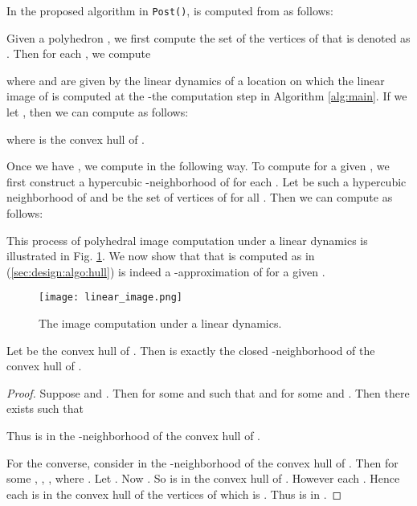 In the proposed algorithm in {\tt Post()},  is computed from  as follows:

Given a polyhedron , we first compute the set of the vertices of  that is denoted as .
Then for each , we compute 
 
where  and  are given by the linear dynamics of a location  on which the linear image of  is computed at the -the computation step in Algorithm \ref{alg:main}. 
If we let , then we can compute  as follows: 

where  is the convex hull of . 

Once we have , we compute  in the following way.
To compute  for a given , we first construct a hypercubic -neighborhood of  for each .
Let  be such a  hypercubic neighborhood of  and  be the set of vertices of  for all .
Then we can compute  as follows:


This process of polyhedral image computation under a linear dynamics is illustrated in Fig. \ref{fig:post:linear}.
We now show that  that is computed as in (\ref{sec:design:algo:hull}) is indeed a -approximation of  for a given .




\begin{figure} [htbp]
\begin{center}
	\texttt{[image: linear\_image.png]}
\caption{The image computation under a linear dynamics.}
\label{fig:post:linear}
\end{center}
\end{figure}




\begin{lem}
Let  be the convex hull of . 
Then  is exactly the closed -neighborhood of the convex hull of .
\end{lem}
\begin{proof}
Suppose  and .
Then  for some  and  such that  and  for some  and .
Then there exists  such that

Thus  is in the -neighborhood of the convex hull of .

For the converse, consider  in the -neighborhood of the convex hull of .
Then for some , , , where .
Let .
Now .
So  is in the convex hull of .
However each .
Hence each  is in the convex hull of the vertices of  which is .
Thus  is in .
\end{proof}



